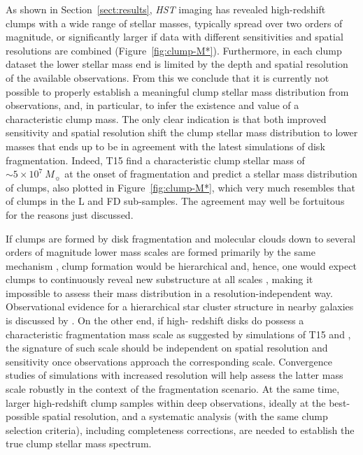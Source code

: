 \documentclass[twocolumn]{aastex61}
\begin{document}
As shown in Section~\ref{sect:results}, {\it HST} imaging has revealed 
high-redshift clumps with a wide range of stellar masses,
typically spread over two orders of magnitude, or significantly larger if data 
with different sensitivities and spatial resolutions are combined 
(Figure~\ref{fig:clump-M*}). Furthermore, in each clump dataset the lower 
stellar mass end is limited by the depth and spatial resolution of the available 
observations. From this we conclude that it is currently not possible to 
properly establish a meaningful clump stellar mass distribution from 
observations, and, in particular, to infer the existence and value of a 
characteristic clump mass. The only clear indication is that both improved 
sensitivity and spatial resolution shift the clump stellar mass distribution to 
lower masses that ends up to be in agreement with the latest simulations of disk 
fragmentation. Indeed, 
T15 find a characteristic clump stellar mass of $\sim 5\times 10^7~M_{\sun}$ at 
the onset of fragmentation and predict a stellar mass distribution of clumps, 
also plotted in Figure~\ref{fig:clump-M*}, which very much resembles that of 
clumps in 
the L and FD sub-samples. The agreement may well be fortuitous for the reasons 
just discussed. 

If clumps are formed by disk fragmentation and molecular clouds down to several 
orders of magnitude lower mass scales are formed primarily by the same mechanism 
\citep[e.g.,][]{tasker09,krumholz10}, clump formation would be hierarchical and, 
hence, one would expect clumps to continuously reveal new substructure at all 
scales \citep{elmegreen11,bournaud16}, making it impossible to assess their mass 
distribution in a resolution-independent way. 
Observational evidence for a hierarchical star cluster structure in nearby 
galaxies is discussed by \citet{gouliermis15}. On the other end, if high-
redshift disks do possess a characteristic fragmentation mass scale as suggested 
by simulations of T15 and \citet{behrendt16}, the signature of such scale should 
be independent on spatial resolution and sensitivity once observations approach 
the corresponding scale. Convergence studies of simulations with increased 
resolution will help assess the latter mass scale robustly in the context of the 
fragmentation scenario.
At the same time, larger high-redshift clump samples within deep observations, 
ideally at the best-possible spatial resolution, and a systematic analysis (with 
the same clump selection criteria), including completeness corrections, are 
needed to establish the true clump stellar mass spectrum. 
\end{document}
